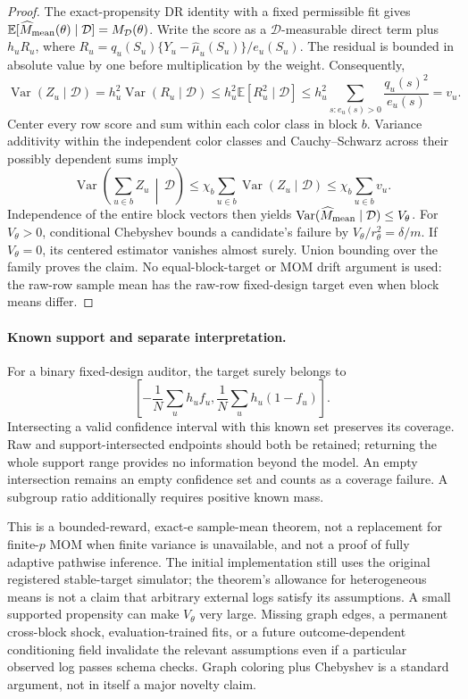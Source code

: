 \begin{proof}
The exact-propensity DR identity with a fixed permissible fit gives
$\mathbb E[\widehat M_{\rm mean}(\theta)\mid\mathcal D]
=M_{\mathcal D}(\theta)$. Write the score as a $\mathcal D$-measurable
direct term plus $h_uR_u$, where
$R_u=q_u(S_u)\{Y_u-\widehat\mu_u(S_u)\}/e_u(S_u)$.
The residual is bounded in absolute value by one before multiplication by
the weight. Consequently,
\[
 \operatorname{Var}(Z_u\mid\mathcal D)
 =h_u^2\operatorname{Var}(R_u\mid\mathcal D)
 \le h_u^2\mathbb E[R_u^2\mid\mathcal D]
 \le h_u^2\sum_{s:e_u(s)>0}\frac{q_u(s)^2}{e_u(s)}=v_u.
\]
Center every row score and sum within each color class in block $b$.
Variance additivity within the independent color classes and
Cauchy--Schwarz across their possibly dependent sums imply
\[
 \operatorname{Var}\left(\sum_{u\in b}Z_u\,\middle|\,\mathcal D\right)
 \le\chi_b\sum_{u\in b}\operatorname{Var}(Z_u\mid\mathcal D)
 \le\chi_b\sum_{u\in b}v_u.
\]
Independence of the entire block vectors then yields
$\operatorname{Var}(\widehat M_{\rm mean}\mid\mathcal D)\le V_\theta$.
For $V_\theta>0$, conditional Chebyshev bounds a candidate's failure by
$V_\theta/r_\theta^2=\delta/m$. If $V_\theta=0$, its centered estimator
vanishes almost surely. Union bounding over the family proves the claim.
No equal-block-target or MOM drift argument is used: the raw-row sample mean
has the raw-row fixed-design target even when block means differ.
\end{proof}

\paragraph{Known support and separate interpretation.}
For a binary fixed-design auditor, the target surely belongs to
\[
 \left[-\frac1N\sum_u h_uf_u,
        \frac1N\sum_u h_u(1-f_u)\right].
\]
Intersecting a valid confidence interval with this known set preserves its
coverage. Raw and support-intersected endpoints should both be retained;
returning the whole support range provides no information beyond the model.
An empty intersection remains an empty confidence set and counts as a
coverage failure. A subgroup ratio additionally requires positive known mass.

This is a bounded-reward, exact-e sample-mean theorem, not a replacement for
finite-$p$ MOM when finite variance is unavailable, and not a proof of fully
adaptive pathwise inference. The initial implementation still uses the original
registered stable-target simulator; the theorem's allowance for heterogeneous
means is not a claim that arbitrary external logs satisfy its assumptions.
A small supported propensity can make $V_\theta$ very large. Missing graph
edges, a permanent cross-block shock, evaluation-trained fits, or a future
outcome-dependent conditioning field invalidate the relevant assumptions even
if a particular observed log passes schema checks. Graph coloring plus
Chebyshev is a standard argument, not in itself a major novelty claim.

